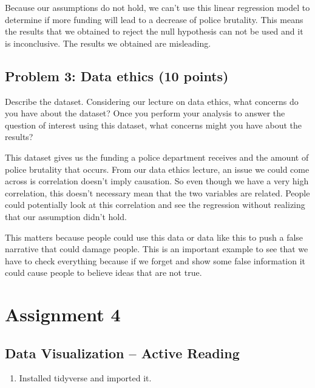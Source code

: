 \documentclass[
]{article}
\providecommand{\tightlist}{%
  \setlength{\itemsep}{0pt}\setlength{\parskip}{0pt}}
\begin{document}
Because our assumptions do not hold, we can't use this linear regression
model to determine if more funding will lead to a decrease of police
brutality. This means the results that we obtained to reject the null
hypothesis can not be used and it is inconclusive. The results we
obtained are misleading.

\hypertarget{problem-3-data-ethics-10-points}{%
\subsection{Problem 3: Data ethics (10
points)}\label{problem-3-data-ethics-10-points}}

Describe the dataset. Considering our lecture on data ethics, what
concerns do you have about the dataset? Once you perform your analysis
to answer the question of interest using this dataset, what concerns
might you have about the results?

This dataset gives us the funding a police department receives and the
amount of police brutality that occurs. From our data ethics lecture, an
issue we could come across is correlation doesn't imply causation. So
even though we have a very high correlation, this doesn't necessary mean
that the two variables are related. People could potentially look at
this correlation and see the regression without realizing that our
assumption didn't hold.

This matters because people could use this data or data like this to
push a false narrative that could damage people. This is an important
example to see that we have to check everything because if we forget and
show some false information it could cause people to believe ideas that
are not true.

\hypertarget{assignment-4}{%
\section{Assignment 4}\label{assignment-4}}

\hypertarget{data-visualization-active-reading}{%
\subsection{Data Visualization -- Active
Reading}\label{data-visualization-active-reading}}

\begin{enumerate}
\def\labelenumi{\arabic{enumi}.}
\tightlist
\item
  Installed tidyverse and imported it.
\end{enumerate}
\end{document}
